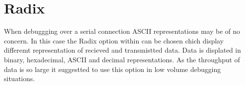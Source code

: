 \section{Radix}

When debuggging over a serial connection ASCII representations may be of no concern.
In this case the Radix option within \ds can be chosen chich display differemt representation of recieved and transmistted data.
Data is displated in binary, hexadecimal, ASCII and decimal representations.
As the throughput of data is so large it suggestted to use this option in low volume debugging situations.
